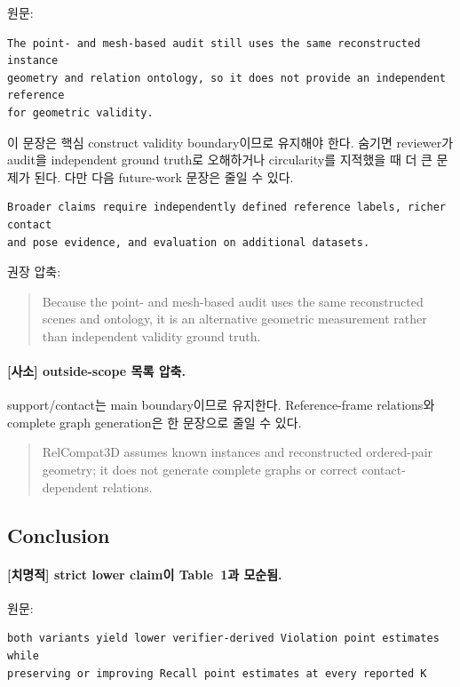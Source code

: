 \documentclass[11pt]{article}
\newcommand{\fatal}{\textbf{\textcolor{fatalred}{[치명적]}}}
\newcommand{\minor}{\textbf{\textcolor{minorblue}{[사소]}}}
\begin{document}
원문:
\begin{verbatim}
The point- and mesh-based audit still uses the same reconstructed instance
geometry and relation ontology, so it does not provide an independent reference
for geometric validity.
\end{verbatim}

이 문장은 핵심 construct validity boundary이므로 유지해야 한다. 숨기면 reviewer가
audit을 independent ground truth로 오해하거나 circularity를 지적했을 때 더 큰 문제가
된다. 다만 다음 future-work 문장은 줄일 수 있다.

\begin{verbatim}
Broader claims require independently defined reference labels, richer contact
and pose evidence, and evaluation on additional datasets.
\end{verbatim}

권장 압축:
\begin{quote}
Because the point- and mesh-based audit uses the same reconstructed scenes and
ontology, it is an alternative geometric measurement rather than independent
validity ground truth.
\end{quote}

\paragraph{\minor{} outside-scope 목록 압축.}

support/contact는 main boundary이므로 유지한다. Reference-frame relations와 complete
graph generation은 한 문장으로 줄일 수 있다.

\begin{quote}
RelCompat3D assumes known instances and reconstructed ordered-pair geometry; it
does not generate complete graphs or correct contact-dependent relations.
\end{quote}

\subsection{Conclusion}

\paragraph{\fatal{} strict lower claim이 Table~1과 모순됨.}

원문:
\begin{verbatim}
both variants yield lower verifier-derived Violation point estimates while
preserving or improving Recall point estimates at every reported K
\end{verbatim}
\end{document}

